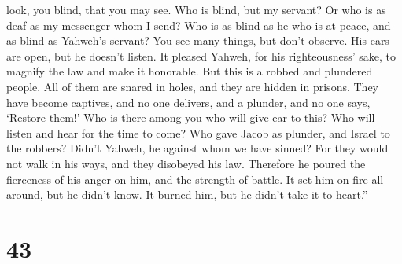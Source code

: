 look, you blind, that you may see.  Who is blind, but my
servant? Or who is as deaf as my messenger whom I send? Who is as blind
as he who is at peace, and as blind as Yahweh's servant? 
You see many things, but don't observe. His ears are open, but he
doesn't listen.  It pleased Yahweh, for his
righteousness' sake, to magnify the law and make it honorable.
 But this is a robbed and plundered people. All of them
are snared in holes, and they are hidden in prisons. They have become
captives, and no one delivers, and a plunder, and no one says, `Restore
them!'  Who is there among you who will give ear to this?
Who will listen and hear for the time to come?  Who gave
Jacob as plunder, and Israel to the robbers? Didn't Yahweh, he against
whom we have sinned? For they would not walk in his ways, and they
disobeyed his law.  Therefore he poured the fierceness of
his anger on him, and the strength of battle. It set him on fire all
around, but he didn't know. It burned him, but he didn't take it to
heart.''

\hypertarget{section-42}{%
\section{43}\label{section-42}}

